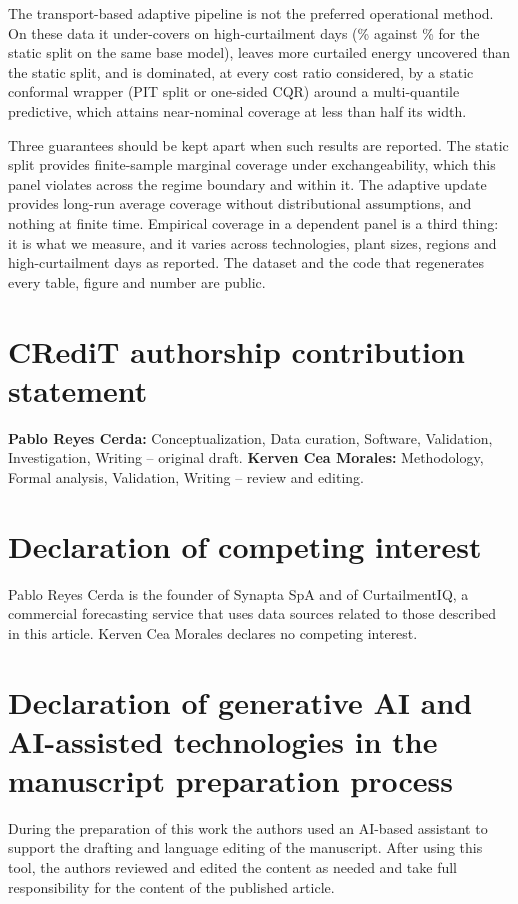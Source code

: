 The transport-based adaptive pipeline is not the preferred operational method. On these data it under-covers on high-curtailment days (\% against \% for the static split on the same base model), leaves more curtailed energy uncovered than the static split, and is dominated, at every cost ratio considered, by a static conformal wrapper (PIT split or one-sided CQR) around a multi-quantile predictive, which attains near-nominal coverage at less than half its width.

Three guarantees should be kept apart when such results are reported. The static split provides finite-sample marginal coverage under exchangeability, which this panel violates across the regime boundary and within it. The adaptive update provides long-run average coverage without distributional assumptions, and nothing at finite time. Empirical coverage in a dependent panel is a third thing: it is what we measure, and it varies across technologies, plant sizes, regions and high-curtailment days as reported. The dataset and the code that regenerates every table, figure and number are public.

\section*{CRediT authorship contribution statement}
\textbf{Pablo Reyes Cerda:} Conceptualization, Data curation, Software, Validation, Investigation, Writing -- original draft. \textbf{Kerven Cea Morales:} Methodology, Formal analysis, Validation, Writing -- review and editing.

\section*{Declaration of competing interest}
Pablo Reyes Cerda is the founder of Synapta SpA and of CurtailmentIQ, a commercial forecasting service that uses data sources related to those described in this article. Kerven Cea Morales declares no competing interest.

\section*{Declaration of generative AI and AI-assisted technologies in the manuscript preparation process}
During the preparation of this work the authors used an AI-based assistant to support the drafting and language editing of the manuscript. After using this tool, the authors reviewed and edited the content as needed and take full responsibility for the content of the published article.

